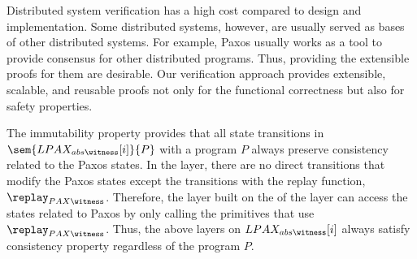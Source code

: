 Distributed system verification has a high cost compared to design and implementation.
Some distributed systems, however, are usually served as bases of other distributed systems. 
For example, Paxos usually works as a tool to provide consensus for other distributed programs.
Thus, providing the extensible proofs for them are desirable. 
Our verification approach provides extensible, scalable, and reusable proofs not only for the functional correctness but also for safety properties. 

The immutability property provides that all state transitions in $\sem{LPAX_{abs\witness}[i]}{P}$ with a program $P$ always preserve consistency related to the Paxos states. 
In the layer, there are no direct transitions that modify the Paxos states except the transitions with the replay function,  $\replay_{PAX\witness}$.
Therefore, the layer built on the of the layer can access the states related to Paxos by only calling the primitives that use $\replay_{PAX\witness}$.
Thus, the above layers on $LPAX_{abs\witness}[i]$ always satisfy consistency property regardless of the program $P$. 

